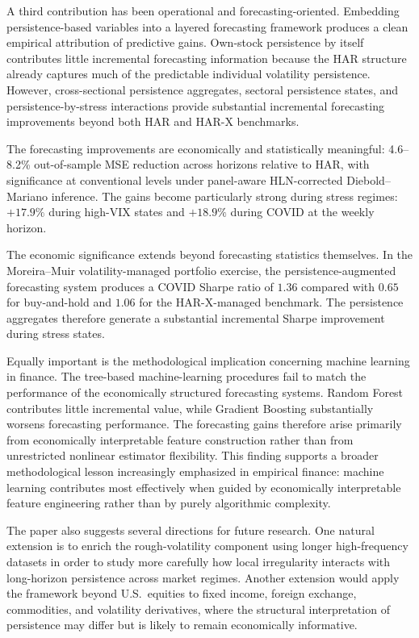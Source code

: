 \documentclass[unnumsec,webpdf,contemporary,large]{oup-authoring-template}%
\theoremstyle{thmstyleone}%
\theoremstyle{thmstyletwo}%
\theoremstyle{thmstylethree}%
\begin{document}
A third contribution has been operational and forecasting-oriented.
Embedding persistence-based variables into a layered forecasting framework
produces a clean empirical attribution of predictive gains. Own-stock
persistence by itself contributes little incremental forecasting information
because the HAR structure already captures much of the predictable
individual volatility persistence. However, cross-sectional persistence
aggregates, sectoral persistence states, and persistence-by-stress
interactions provide substantial incremental forecasting improvements beyond
both HAR and HAR-X benchmarks.

The forecasting improvements are economically and statistically meaningful:
4.6--8.2\% out-of-sample MSE reduction across horizons relative to HAR,
with significance at conventional levels under panel-aware HLN-corrected
Diebold--Mariano inference. The gains become particularly strong during
stress regimes: $+17.9\%$ during high-VIX states and $+18.9\%$ during
COVID at the weekly horizon.

The economic significance extends beyond forecasting statistics themselves.
In the Moreira--Muir volatility-managed portfolio exercise, the
persistence-augmented forecasting system produces a COVID Sharpe ratio of
$1.36$ compared with $0.65$ for buy-and-hold and $1.06$ for the
HAR-X-managed benchmark. The persistence aggregates therefore generate a
substantial incremental Sharpe improvement during stress states.

Equally important is the methodological implication concerning machine
learning in finance. The tree-based machine-learning procedures fail to
match the performance of the economically structured forecasting systems.
Random Forest contributes little incremental value, while Gradient Boosting
substantially worsens forecasting performance. The forecasting gains
therefore arise primarily from economically interpretable feature
construction rather than from unrestricted nonlinear estimator flexibility.
This finding supports a broader methodological lesson increasingly
emphasized in empirical finance: machine learning contributes most
effectively when guided by economically interpretable feature engineering
rather than by purely algorithmic complexity.

The paper also suggests several directions for future research. One natural
extension is to enrich the rough-volatility component using longer
high-frequency datasets in order to study more carefully how local
irregularity interacts with long-horizon persistence across market regimes.
Another extension would apply the framework beyond U.S.\ equities to fixed
income, foreign exchange, commodities, and volatility derivatives, where
the structural interpretation of persistence may differ but is likely to
remain economically informative.
\end{document}
